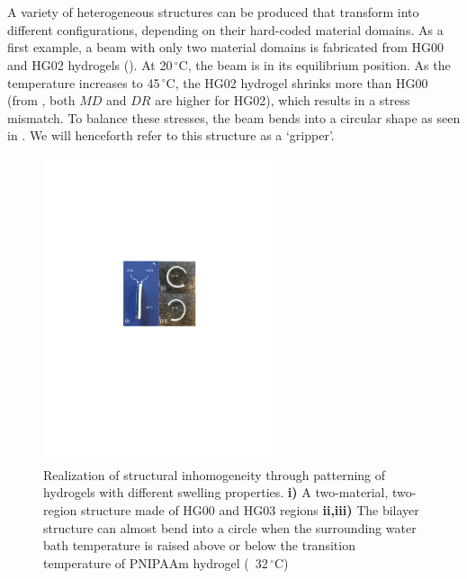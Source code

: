 \section{}
A variety of heterogeneous structures can be produced that transform into different configurations, depending on their hard-coded material domains.
As a first example, a beam with only two material domains is fabricated from HG00 and HG02 hydrogels (). 
At 20\,$^{\circ}$C, the beam is in its equilibrium position. As the temperature increases to 45\,$^{\circ}$C, the HG02 hydrogel shrinks more than HG00 (from , both $MD$ and $DR$ are higher for HG02), 
which results in a stress mismatch. To balance these stresses, the beam bends into a circular shape as seen in .
We will henceforth refer to this structure as a `gripper'. %
\begin{figure}[!ht]
\centering
\includegraphics[width=0.6\textwidth]{bilayer.pdf}
\caption[]{Realization of structural inhomogeneity through patterning of hydrogels with different swelling properties. \textbf{i)} A two-material, two-region structure made of HG00 and HG03 regions \textbf{ii,iii)} The bilayer structure can almost bend into a circle when the surrounding water bath temperature is raised above or below the transition temperature of PNIPAAm hydrogel (~32\,$^{\circ}$C)}
\label{fig:bilayer}
\end{figure}

